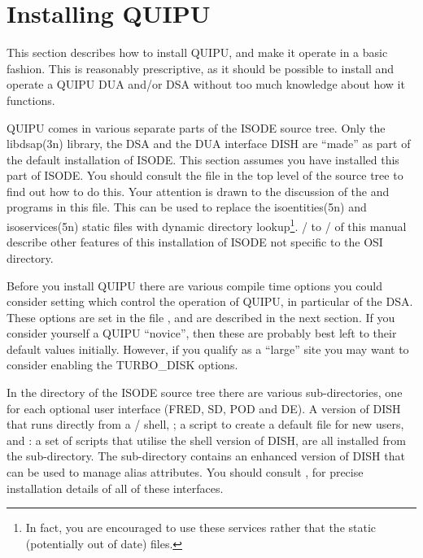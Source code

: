 
\chapter {Installing QUIPU}

\label{quipu:install}

This section describes how to install QUIPU, and make it operate in a basic
fashion.  This is reasonably prescriptive, as it should be possible to
install and operate a QUIPU DUA and/or DSA without too much 
knowledge about how it functions.

QUIPU comes in various separate parts of the ISODE source tree.  Only the
\man libdsap(3n) library, the DSA  
and the DUA interface DISH are 
``made'' as part of the default installation of ISODE.
This section assumes you have installed this part of ISODE.  
You should consult the  file in the
top level of the source tree to find out how to do this.
Your attention is drawn to the discussion of the  and
 programs in this  file.  This can be used to
replace the \man isoentities(5n) and \man isoservices(5n) static files
with dynamic directory lookup\footnote{In fact, you are encouraged to
use these services rather that the static (potentially out of date) files.}.
\volone/ to \volfour/ of this manual describe other features of 
this installation of ISODE not specific to the OSI directory.

Before you install QUIPU
there are various compile time options you could consider setting which control
the operation of QUIPU, in particular of the DSA. 
These options are set in the file , and are
described in the next section.
If you consider yourself a QUIPU ``novice'', then these 
are probably best left to their default values initially.
However, if you qualify as a ``large'' site you may want to consider enabling
the TURBO\_DISK options.


In the  directory of the ISODE source tree
there are various sub-directories, one for each optional user interface
(FRED, SD, POD and DE).
A version of DISH that runs directly 
from a \unix/ shell, ;
a script to create a default  file for new users, and 
: a set of scripts that utilise the shell version of DISH,
are all installed from the  sub-directory.
The  sub-directory contains an enhanced version of DISH
that can be used to manage alias attributes.
You should consult , for precise installation
details of all of these interfaces.


